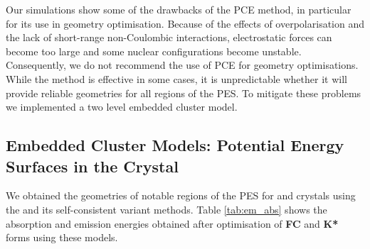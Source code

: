 Our simulations show some of the drawbacks of the PCE method, in particular for its use in geometry optimisation. Because of the effects of overpolarisation and the lack of short-range non-Coulombic interactions, electrostatic forces can become too large and some nuclear configurations become unstable. Consequently, we do not recommend the use of PCE for geometry optimisations. While the method is effective in some cases,\cite{Wilbraham2015,Presti2017} it is unpredictable whether it will provide reliable geometries for all regions of the PES. To mitigate these problems we implemented a two level embedded cluster model.


\subsection{Embedded Cluster Models: Potential Energy Surfaces in the Crystal}
\label{sec:cluster}

We obtained the geometries of notable regions of the PES for \HC{} and \HCC{} crystals using the \EEC{} and its self-consistent variant \SCEEC{} methods. Table \ref{tab:em_abs} shows the absorption and emission energies obtained after optimisation of \textbf{FC} and \textbf{K*} forms using these models.  

